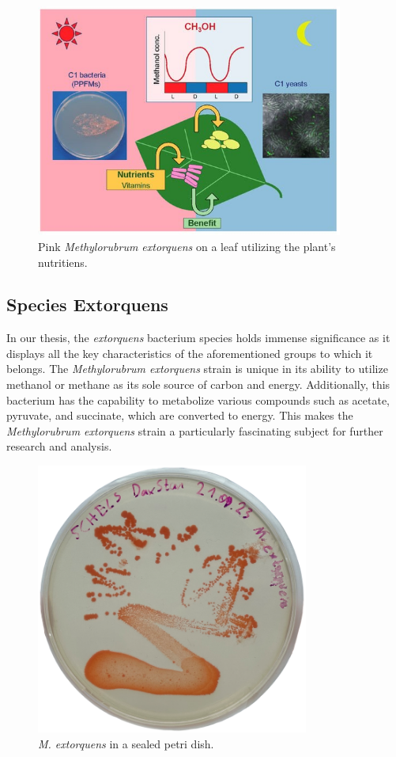 \begin{figure}[H]
    \centering
    \includegraphics[width=0.9\textwidth]{./media/images/mextorquens_on_leaf}
    \caption{Pink \emph{Methylorubrum extorquens} on a leaf utilizing the plant's nutritiens.}
    \label{fig:mextorquens_on_leaf}
\end{figure}

\subsection{Species Extorquens}
In our thesis, the \emph{extorquens} bacterium species holds immense significance as it displays all the key characteristics of the aforementioned groups to which it belongs.
The \emph{Methylorubrum extorquens} strain is unique in its ability to utilize methanol or methane as its sole source of carbon and energy.
Additionally, this bacterium has the capability to metabolize various compounds such as acetate, pyruvate, and succinate, which are converted to energy.
This makes the \emph{Methylorubrum extorquens} strain a particularly fascinating subject for further research and analysis.

\begin{figure}[H]
    \centering
    \includegraphics[width=0.8\textwidth]{./media/images/mextorquens_sealed}
    \caption{\emph{M. extorquens} in a sealed petri dish.}
    \label{fig:mextorquens_petri_sealed}
\end{figure}


